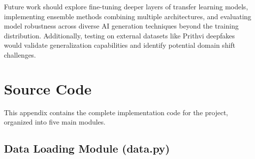 \documentclass[man,12pt,letterpaper,donotrepeattitle,floatsintext]{apa7}
\begin{document}
Future work should explore fine-tuning deeper layers of transfer learning models, 
implementing ensemble methods combining multiple architectures, and evaluating model 
robustness across diverse AI generation techniques beyond the training distribution. 
Additionally, testing on external datasets like Prithvi deepfakes would validate 
generalization capabilities and identify potential domain shift challenges.

\newpage


\newpage
\appendix
\section{Source Code}

This appendix contains the complete implementation code for the project, organized into five main modules.

\subsection{Data Loading Module (data.py)}
\end{document}
